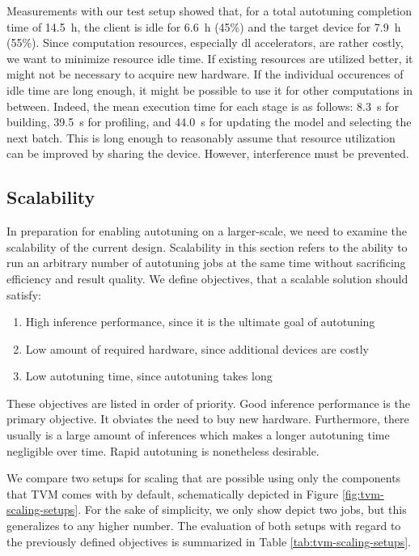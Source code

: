 Measurements with our test setup showed that, for a total autotuning completion time of \SI{14.5}{\hour}, the client is idle for \SI{6.6}{\hour} (45\%) and the target device for \SI{7.9}{\hour} (55\%). Since computation resources, especially \gls{dl} accelerators, are rather costly, we want to minimize resource idle time. If existing resources are utilized better, it might not be necessary to acquire new hardware. If the individual occurences of idle time are long enough, it might be possible to use it for other computations in between. Indeed, the mean execution time for each stage is as follows: \SI{8.3}{\second} for building, \SI{39.5}{\second} for profiling, and \SI{44.0}{\second} for updating the model and selecting the next batch. This is long enough to reasonably assume that resource utilization can be improved by sharing the device. However, interference must be prevented.

\subsection{Scalability}
In preparation for enabling autotuning on a larger-scale, we need to examine the scalability of the current design. Scalability in this section refers to the ability to run an arbitrary number of autotuning jobs at the same time without sacrificing efficiency and result quality. We define objectives, that a scalable solution should satisfy:
\begin{enumerate}
	\item High inference performance, since it is the ultimate goal of autotuning
	\item Low amount of required hardware, since additional devices are costly
	\item Low autotuning time, since autotuning takes long
\end{enumerate}
These objectives are listed in order of priority. Good inference performance is the primary objective. It obviates the need to buy new hardware. Furthermore, there usually is a large amount of inferences which makes a longer autotuning time negligible over time. Rapid autotuning is nonetheless desirable.

We compare two setups for scaling that are possible using only the components that TVM comes with by default, schematically depicted in Figure \ref{fig:tvm-scaling-setups}. For the sake of simplicity, we only show depict two jobs, but this generalizes to any higher number. The evaluation of both setups with regard to the previously defined objectives is summarized in Table \ref{tab:tvm-scaling-setups}.

